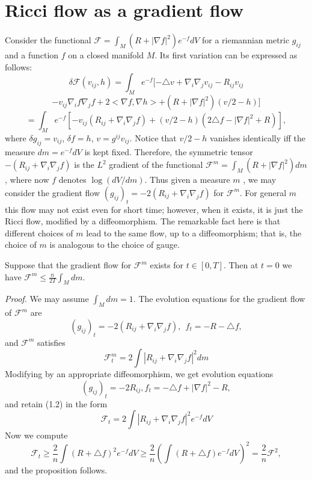 \documentclass[12pt]{article}
\newcommand{\cF}{\mathcal {F}}
\theoremstyle{plain}
{\swapnumbers
\newtheorem{thm}{Theorem}[section]
\newtheorem{cor}[thm]{Corollary}
\newtheorem{lem}[thm]{Lemma}
\newtheorem{prop}[thm]{Proposition}
}
\theoremstyle{definition}
{\swapnumbers
\newtheorem{defn}[thm]{Definition}
\newtheorem{nota}[thm]{Notation}
\newtheorem{parag}[thm]{}
\newtheorem*{parstr}{\addtocounter{thm}{1}\thesection.\arabic{thm}*}
\newtheorem*{intropar}{\addtocounter{thm}{1}\arabic{thm}}
}
\theoremstyle{remark} {\swapnumbers
\newtheorem{rem}[thm]{Remark}
\newtheorem{exam}[thm]{Example}
\newtheorem{lemma}[thm]{Lemma}
\newtheorem{claim}[thm]{Claim}
}
\numberwithin{equation}{section}
\begin{document}
\section{Ricci flow as a gradient flow}
\begin{parag} Consider the functional $\cF=\int_M{(R+|\nabla
f|^2)e^{-f}dV}$ for a riemannian metric $g_{ij}$ and a function
$f$ on a closed manifold $M$. Its first variation can be expressed
as follows:
$$ \delta \cF (v_{ij},h)=\int_M e^{-f}[-\triangle
v+\nabla_i\nabla_jv_{ij}-R_{ij}v_{ij}$$ $$-v_{ij}\nabla_i
f\nabla_j f+2<\nabla f,\nabla h>+(R+|\nabla f|^2)(v/2-h)]$$
$$=\int_M{e^{-f}[-v_{ij}(R_{ij}+\nabla_i\nabla_j
f)+(v/2-h)(2\triangle f-|\nabla f|^2+R)]},$$where $\delta
g_{ij}=v_{ij}$, $\delta f=h$, $v=g^{ij}v_{ij}$. Notice that
$v/2-h$ vanishes identically iff the measure $dm=e^{-f}dV$ is kept
fixed. Therefore, the symmetric tensor $-(R_{ij}+\nabla_i\nabla_j
f)$ is the $L^2$ gradient of the functional $\cF^m
=\int_M{(R+|\nabla f|^2)dm}$, where now $f$ denotes $\log(dV/dm)$.
Thus given a measure $m$ , we may consider the gradient flow
$(g_{ij})_t=-2(R_{ij}+\nabla_i\nabla_j f)$ for $\cF^m$. For
general $m$ this flow may not exist even for short time; however,
when it exists, it is just the Ricci flow, modified by a
diffeomorphism. The remarkable fact here is that different choices
of $m$ lead to the same flow, up to a diffeomorphism; that is, the
choice of $m$ is analogous to the choice of gauge.
\end{parag}
\begin{prop}
  Suppose that the gradient flow for $\cF^m$ exists for
$t\in[0,T].$ Then at $t=0$ we have $\cF^m\le
\frac{n}{2T}\int_M{dm}.$ \end{prop} {\it Proof.}   We may assume
$\int_M{dm}=1.$ The evolution equations for the gradient flow of
$\cF^m$ are \begin{equation} (g_{ij})_t=-2(R_{ij}+\nabla_i\nabla_j
f) ,\ \  f_t=-R-\triangle f ,\end{equation} and $\cF^m$ satisfies
\begin{equation}
 \cF^m_t=2\int{|R_{ij}+\nabla_i\nabla_j f|^2 dm}
\end{equation}
Modifying by an appropriate diffeomorphism, we get evolution
equations \begin{equation}   (g_{ij})_t=-2R_{ij} , f_t=-\triangle
f + |\nabla f|^2 - R ,\end{equation} and retain (1.2) in the form
\begin{equation} \cF_t=2\int{|R_{ij}+\nabla_i\nabla_j f|^2e^{-f}dV}
\end{equation}  Now we compute
$$\cF_t\ge\frac{2}{n}\int{(R+\triangle
f)^2e^{-f}dV}\ge\frac{2}{n}(\int{(R+\triangle
f)e^{-f}dV})^2=\frac{2}{n}\cF^2,$$ and the proposition follows.
\end{document}
